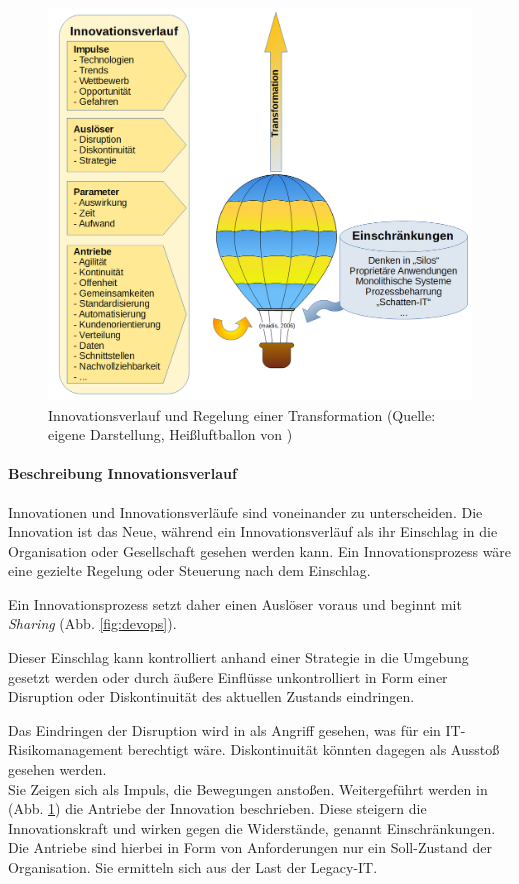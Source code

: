 \begin{figure}[htbp]
 \centering
 \includegraphics[width=1.0\textwidth]{gfx/digital-transformation-lifecycle-by-selim3.PNG}
 \caption{Innovationsverlauf und Regelung einer Transformation (Quelle: eigene Darstellung, Heißluftballon von \citet{maidis_2006})\label{fig:digit-trans}
 }
\end{figure}
%
\paragraph{Beschreibung Innovationsverlauf}
Innovationen und Innovationsverläufe sind voneinander zu unterscheiden. Die Innovation ist das Neue, während ein Innovationsverläuf als ihr Einschlag in die Organisation oder Gesellschaft gesehen werden kann. Ein Innovationsprozess wäre eine gezielte Regelung oder Steuerung nach dem Einschlag.

Ein Innovationsprozess setzt daher einen Auslöser voraus und beginnt mit \emph{Sharing} (Abb. \ref{fig:devops}).

Dieser Einschlag kann kontrolliert anhand einer Strategie in die Umgebung gesetzt werden oder durch äußere Einflüsse unkontrolliert in Form einer Disruption oder Diskontinuität \cite{Fernandez:2020} des aktuellen Zustands eindringen.

Das Eindringen der Disruption wird in  als Angriff gesehen, was für ein IT-Risikomanagement berechtigt wäre.
Diskontinuität könnten dagegen als Ausstoß gesehen werden.
\medskip
\\
Sie Zeigen sich als Impuls, die Bewegungen anstoßen.
Weitergeführt werden in (Abb. \ref{fig:digit-trans}) die Antriebe der Innovation beschrieben. Diese steigern die Innovationskraft und wirken gegen die Widerstände, genannt Einschränkungen. Die Antriebe sind hierbei in Form von Anforderungen nur ein Soll-Zustand der Organisation. Sie ermitteln sich aus der Last der Legacy-IT. 
%
